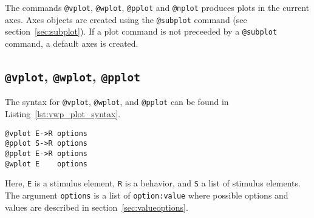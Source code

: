 \documentclass[11pt]{article}
\begin{document}
The commands \verb|@vplot|, \verb|@wplot|, \verb|@pplot| and \verb|@nplot| produces plots in the current axes. Axes objects are created using the \verb|@subplot| command (see section~\ref{sec:subplot}). If a plot command is not preceeded by a \verb|@subplot| command, a default axes is created.

\subsection{\texttt{@vplot}, \texttt{@wplot}, \texttt{@pplot}}
\label{sec:vwp_plot}
The syntax for \verb|@vplot|, \verb|@wplot|, and \verb|@pplot| can be found in Listing~\ref{lst:vwp_plot_syntax}.
\begin{lstlisting}[caption={Syntax for \texttt{@vplot}, \texttt{@pplot} and \texttt{@wplot}}, label=lst:vwp_plot_syntax]
@vplot E->R options
@pplot S->R options
@pplot E->R options
@wplot E    options
\end{lstlisting}
Here, \verb|E| is a stimulus element, \verb|R| is a behavior, and \verb|S| a list of stimulus elements. The argument \verb|options| is a list of \verb|option:value| where possible options and values are described in section~\ref{sec:valueoptions}. 
%
\end{document}
